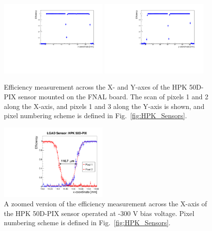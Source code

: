 \documentclass[preprint,1p]{elsarticle}
\begin{document}
\begin{figure}[htbp] 
\centering
\includegraphics[width=0.48\textwidth]{figs/FNALBoard_HPK50DPix_Run847-891/Eff_vs_X_Ch4_5.pdf} 
\includegraphics[width=0.48\textwidth]{figs/FNALBoard_HPK50DPix_Run847-891/Eff_vs_Y_Ch3_4.pdf} 
\caption{Efficiency measurement across the X- and Y-axes of the HPK 50D-PIX sensor mounted on the FNAL board. The scan of pixels 1 and 2 along the X-axis, and pixels 1 and 3 along the Y-axis is shown, and pixel numbering scheme is defined in Fig.~\ref{fig:HPK_Sensors}.} 
\label{fig:FNAL_HPK50_effXY} 
\end{figure} 

\begin{figure}[htbp] 
\centering
\includegraphics[width=0.48\textwidth]{figs/KUBoard_HPK50DPix_Run638-781/EfficiencyInGap_HPK50DPix_fit.pdf} 
\caption{A zoomed version of the efficiency measurement across the X-axis of the HPK 50D-PIX sensor operated at -300 V bias voltage. Pixel numbering scheme is defined in Fig.~\ref{fig:HPK_Sensors}.} 
\label{fig:FNAL_HPK50_ZoomeffXY} 
\end{figure} 
\end{document}
